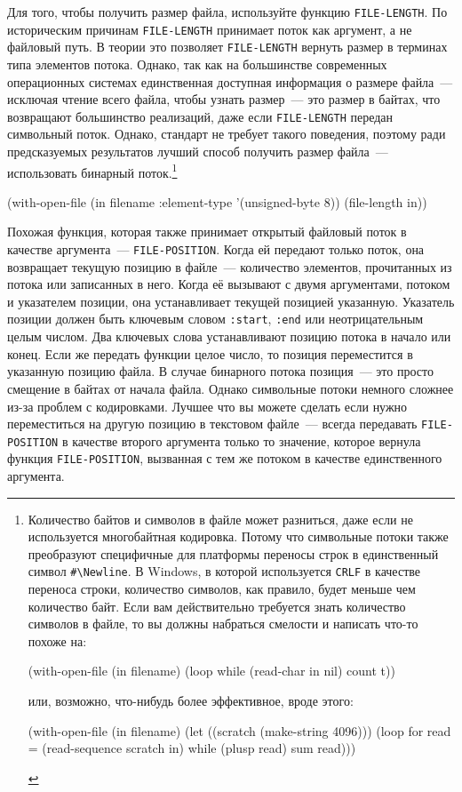 Для того, чтобы получить размер файла, используйте функцию \lstinline{FILE-LENGTH}. По
историческим причинам \lstinline{FILE-LENGTH} принимает поток как аргумент, а не файловый
путь. В теории это позволяет \lstinline{FILE-LENGTH} вернуть размер в терминах типа элементов
потока. Однако, так как на большинстве современных операционных системах единственная
доступная информация о размере файла~--- исключая чтение всего файла, чтобы узнать
размер~--- это размер в байтах, что возвращают большинство реализаций, даже если
\lstinline{FILE-LENGTH} передан символьный поток. Однако, стандарт не требует такого поведения,
поэтому ради предсказуемых результатов лучший способ получить размер файла~---
использовать бинарный поток.\footnote{Количество байтов и символов в файле может
  разниться, даже если не используется многобайтная кодировка. Потому что символьные
  потоки также преобразуют специфичные для платформы переносы строк в единственный символ
  \lstinline!#\Newline!. В Windows, в которой используется \lstinline{CRLF} в качестве переноса
  строки, количество символов, как правило, будет меньше чем количество байт. Если вам
  действительно требуется знать количество символов в файле, то вы должны набраться
  смелости и написать что-то похоже на:

\begin{myverb}
(with-open-file (in filename) 
  (loop while (read-char in nil) count t))
\end{myverb}

\noindent{}или, возможно, что-нибудь более эффективное, вроде этого:

\begin{myverb}
(with-open-file (in filename) 
  (let ((scratch (make-string 4096))) 
    (loop for read = (read-sequence scratch in) 
          while (plusp read) sum read)))
\end{myverb}
}

\begin{myverb}
(with-open-file (in filename :element-type '(unsigned-byte 8)) 
  (file-length in)) 
\end{myverb}

Похожая функция, которая также принимает открытый файловый поток в качестве аргумента~---
\lstinline{FILE-POSITION}. Когда ей передают только поток, она возвращает текущую позицию в
файле~--- количество элементов, прочитанных из потока или записанных в него. Когда её
вызывают с двумя аргументами, потоком и указателем позиции, она устанавливает текущей
позицией указанную. Указатель позиции должен быть ключевым словом \lstinline{:start},
\lstinline{:end} или неотрицательным целым числом. Два ключевых слова устанавливают позицию
потока в начало или конец. Если же передать функции целое число, то позиция переместится в
указанную позицию файла. В случае бинарного потока позиция~--- это просто смещение в байтах
от начала файла. Однако символьные потоки немного сложнее из-за проблем с
кодировками. Лучшее что вы можете сделать если нужно переместиться на другую позицию в
текстовом файле~--- всегда передавать \lstinline{FILE-POSITION} в качестве второго аргумента
только то значение, которое вернула функция \lstinline{FILE-POSITION}, вызванная с тем же
потоком в качестве единственного аргумента.

